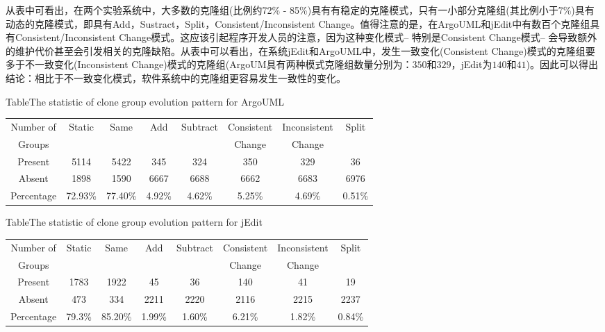 从表中可看出，在两个实验系统中，大多数的克隆组(比例约72\% - 85\%)具有有稳定的克隆模式，只有一小部分克隆组(其比例小于7\%)具有动态的克隆模式，即具有Add，Sustract，Split，Consistent/Inconsistent Change。值得注意的是，在ArgoUML和jEdit中有数百个克隆组具有Consistent/Inconsistent Change模式。这应该引起程序开发人员的注意，因为这种变化模式-- 特别是Consistent Change模式-- 会导致额外的维护代价甚至会引发相关的克隆缺陷。从表中可以看出，在系统jEdit和ArgoUML中，发生一致变化(Consistent Change)模式的克隆组要多于不一致变化(Inconsistent Change)模式的克隆组(ArgoUM具有两种模式克隆组数量分别为：$350$和$329$，jEdit为$140$和$41$)。因此可以得出结论：相比于不一致变化模式，软件系统中的克隆组更容易发生一致性的变化。

\begin{table}[htbp]
{Table$\!$}{The statistic of clone group evolution pattern for ArgoUML}
\vspace{0.5em}
\centering
\wuhao
\begin{tabular}{cccccccc}
\toprule[1.5pt]
Number of&\multirow{2}{*}{Static}&\multirow{2}{*}{Same}&\multirow{2}{*}{Add}&\multirow{2}{*}{Subtract}&Consistent&Inconsistent&\multirow{2}{*}{Split}\\ 
Groups&&&&&Change&Change&\\ 
\midrule[1pt]
Present	&5114	&5422	&345	&324	&350	&329	&36\\ 
Absent	&1898	&1590	&6667	&6688	&6662	&6683	&6976\\ 
Percentage	&72.93\%	&77.40\%	&4.92\%	&4.62\%	&5.25\%	&4.69\%	&0.51\%\\ 
\bottomrule[1.5pt]
\end{tabular}
\end{table}

\begin{table}[htbp]
{Table$\!$}{The statistic of clone group evolution pattern for jEdit}
\vspace{0.5em}
\centering
\wuhao
\begin{tabular}{cccccccc}
\toprule[1.5pt]
Number of&\multirow{2}{*}{Static}&\multirow{2}{*}{Same}&\multirow{2}{*}{Add}&\multirow{2}{*}{Subtract}&Consistent&Inconsistent&\multirow{2}{*}{Split}\\ 
Groups&&&&&Change&Change&\\ 
\midrule[1pt]
Present	&1783	&1922	&45	&36	&140	&41	&19\\ 
Absent	&473	&334	&2211	&2220	&2116	&2215	&2237\\ 
Percentage	&79.3\%	&85.20\%	&1.99\%	&1.60\%	&6.21\%	&1.82\%	&0.84\%\\ 
\bottomrule[1.5pt]
\end{tabular}
\end{table}


